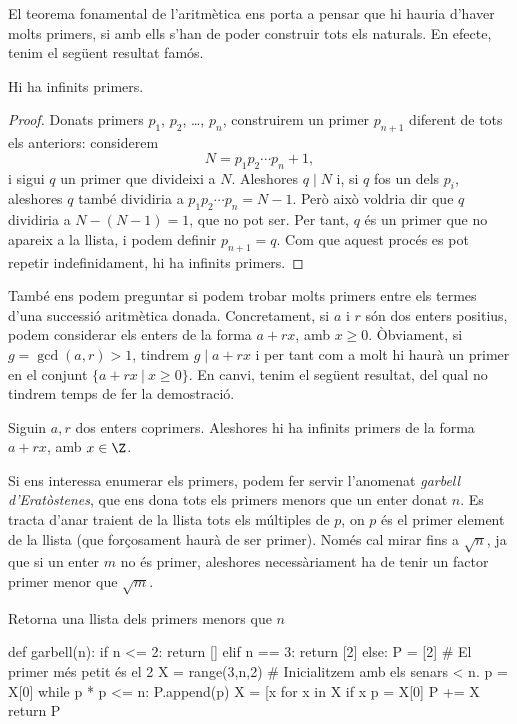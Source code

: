 El teorema fonamental de l'aritmètica ens porta a pensar que hi hauria d'haver molts primers, si amb ells s'han de poder construir tots els naturals. En efecte, tenim el següent resultat famós.

\begin{theorem}[Euclides]
 Hi ha infinits primers.
\end{theorem}
\begin{proof}
 Donats primers $p_1$, $p_2$, \ldots, $p_n$, construirem un primer $p_{n+1}$ diferent de tots els anteriors: considerem
 \[
 N= p_1 p_2\cdots p_n +1,
 \]
 i sigui $q$ un primer que divideixi a $N$. Aleshores $q\mid N$ i, si $q$ fos un dels $p_i$, aleshores $q$ també dividiria a $p_1p_2\cdots p_n = N-1$. Però això voldria dir que $q$ dividiria a $N-(N-1)=1$, que no pot ser. Per tant, $q$ és un primer que no apareix a la llista, i podem definir $p_{n+1} = q$. Com que aquest procés es pot repetir indefinidament, hi ha  infinits primers.
\end{proof}

També ens podem preguntar si podem trobar molts primers entre els termes d'una successió aritmètica donada. Concretament, si $a$ i $r$ són dos enters positius, podem considerar els enters de la forma $a + rx$, amb $x\geq 0$. Òbviament, si $g=\gcd(a,r)>1$, tindrem $g\mid a+rx$ i per tant com a molt hi haurà un primer en el conjunt $\{a+rx ~|~ x\geq 0\}$. En canvi, tenim el següent resultat, del qual no tindrem temps de fer la demostració.
\begin{theorem}[Dirichlet]
Siguin $a,r$ dos enters coprimers. Aleshores hi ha infinits primers de la forma $a+rx$, amb $x\in\Z$.
\end{theorem}


Si ens interessa enumerar els primers, podem fer servir l'anomenat \emph{garbell d'Eratòstenes}, que ens dona tots els primers menors que un enter donat $n$. Es tracta d'anar traient de la llista tots els múltiples de $p$, on $p$ és el primer element de la llista (que forçosament haurà de ser primer). Només cal mirar fins a $\sqrt{n}$, ja que si un enter $m$ no és primer, aleshores necessàriament ha de tenir un factor primer menor que $\sqrt{m}$.

\begin{algorithm}
\caption{Retorna una llista dels primers menors que $n$}
\begin{python}
def garbell(n):
    if n <= 2:
        return []
    elif n == 3:
        return [2]
    else:
        P = [2] # El primer més petit és el 2
        X = range(3,n,2) # Inicialitzem amb els senars < n.
        p = X[0]
        while p * p <= n:
            P.append(p)
            X = [x for x in X if x %
            p = X[0]
        P += X
        return P
\end{python}
\end{algorithm}

